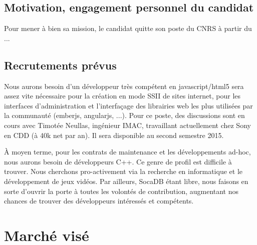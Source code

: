 \documentclass[a4paper,10pt]{scrreprt}
\begin{document}
    
    \section{Motivation, engagement personnel du candidat}
        
        Pour mener à bien sa mission, le candidat quitte son poste du CNRS à partir du ...
        
    \section{Recrutements prévus}

        Nous aurons besoin d'un développeur très compétent en javascript/html5 sera assez vite nécessaire pour la création en mode SSII de sites internet, pour les interfaces d'administration et l'interfaçage des librairies web les plus utilisées par la communauté (emberjs, angularjs, ...). Pour ce poste, des discussions sont en cours avec Timotée Neullas, ingénieur IMAC, travaillant actuellement chez Sony en CDD (à 40k\texteuro{} net par an). Il sera disponible au second semestre 2015.

        À moyen terme, pour les contrats de maintenance et les développements ad-hoc, nous aurons besoin de développeurs C++. Ce genre de profil est difficile à trouver. Nous cherchons pro-activement via la recherche en informatique et le développement de jeux vidéos. Par ailleurs, SocaDB étant libre, nous faisons en sorte d'ouvrir la porte à toutes les volontés de contribution, augmentant nos chances de trouver des développeurs intéressés et compétents.
        
\chapter{Marché visé}
\end{document}
